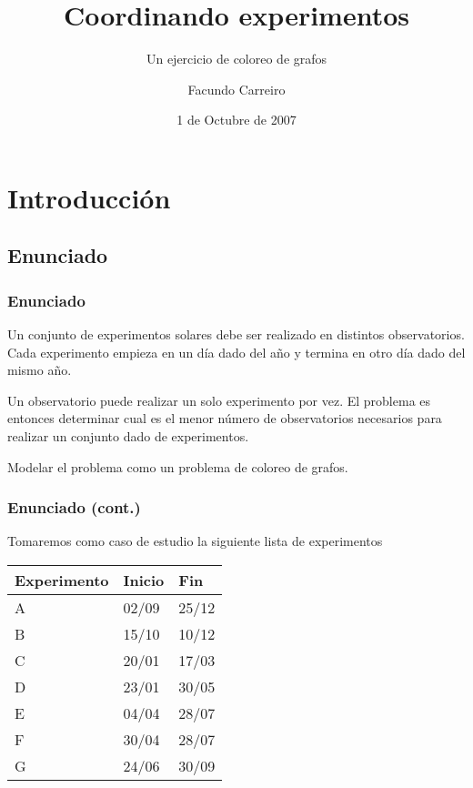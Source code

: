 \documentclass[table,dvipsnames]{beamer}
\title{Coordinando experimentos}
\subtitle{Un ejercicio de coloreo de grafos}
\author{Facundo Carreiro}
\institute{Universidad de Buenos Aires}
\date{1 de Octubre de 2007}
\begin{document}
\begin{frame}
\titlepage
\end{frame}

\begin{frame} 
\tableofcontents 
\end{frame}

\section{Introducci\'on}
\subsection{Enunciado}
\begin{frame}
\frametitle{Enunciado}

Un conjunto de experimentos solares debe ser realizado en distintos
observatorios. Cada experimento empieza en un d\'ia dado del a\~no y
termina en otro d\'ia dado del mismo a\~no.

\vspace{20pt}
Un observatorio puede realizar
un solo experimento por vez. El problema es entonces determinar cual
es el menor n\'umero de observatorios necesarios para realizar un 
conjunto dado de experimentos.

\vspace{20pt}
Modelar el problema como un problema
de coloreo de grafos.
\end{frame}

\begin{frame}
\frametitle{Enunciado (cont.)}

Tomaremos como caso de estudio la siguiente lista de experimentos

\begin{center}
\begin{tabular}{lll}
\textbf{Experimento} & \textbf{Inicio} & \textbf{Fin} \\
\hline
A & 02/09 & 25/12 \\
B & 15/10 & 10/12 \\
C & 20/01 & 17/03 \\
D & 23/01 & 30/05 \\
E & 04/04 & 28/07 \\
F & 30/04 & 28/07 \\
G & 24/06 & 30/09 \\
\end{tabular}
\end{center}

\end{frame}
\end{document}
